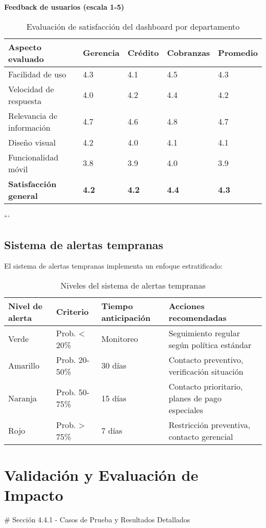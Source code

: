 \textbf{Feedback de usuarios (escala 1-5)}
\begin{table}[ht]
\centering
\begin{tabular}{|p{4cm}|p{2cm}|p{2cm}|p{2cm}|p{2cm}|}
\hline
\textbf{Aspecto evaluado} & \textbf{Gerencia} & \textbf{Crédito} & \textbf{Cobranzas} & \textbf{Promedio} \\
\hline
Facilidad de uso & 4.3 & 4.1 & 4.5 & 4.3 \\
\hline
Velocidad de respuesta & 4.0 & 4.2 & 4.4 & 4.2 \\
\hline
Relevancia de información & 4.7 & 4.6 & 4.8 & 4.7 \\
\hline
Diseño visual & 4.2 & 4.0 & 4.1 & 4.1 \\
\hline
Funcionalidad móvil & 3.8 & 3.9 & 4.0 & 3.9 \\
\hline
\textbf{Satisfacción general} & \textbf{4.2} & \textbf{4.2} & \textbf{4.4} & \textbf{4.3} \\
\hline
\end{tabular}
\caption{Evaluación de satisfacción del dashboard por departamento}
\end{table}
```

\subsection{Sistema de alertas tempranas}
El sistema de alertas tempranas implementa un enfoque estratificado:

\begin{table}[ht]
\centering
\begin{tabular}{|p{2.5cm}|p{2.5cm}|p{3cm}|p{6cm}|}
\hline
\textbf{Nivel de alerta} & \textbf{Criterio} & \textbf{Tiempo anticipación} & \textbf{Acciones recomendadas} \\
\hline
Verde & Prob. < 20\% & Monitoreo & Seguimiento regular según política estándar \\
\hline
Amarillo & Prob. 20-50\% & 30 días & Contacto preventivo, verificación situación \\
\hline
Naranja & Prob. 50-75\% & 15 días & Contacto prioritario, planes de pago especiales \\
\hline
Rojo & Prob. > 75\% & 7 días & Restricción preventiva, contacto gerencial \\
\hline
\end{tabular}
\caption{Niveles del sistema de alertas tempranas}
\end{table}

\section{Validación y Evaluación de Impacto}
\# Sección 4.4.1 - Casos de Prueba y Resultados Detallados

